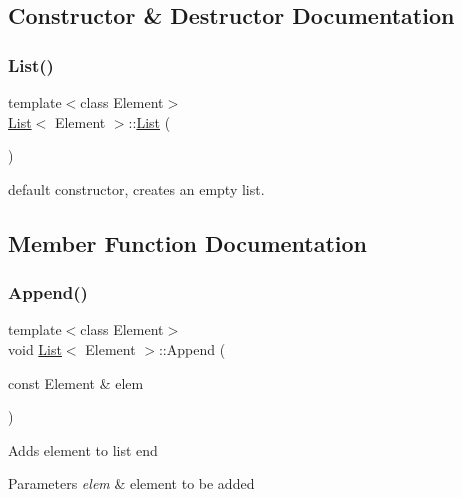 \subsection{Constructor \& Destructor Documentation}
\mbox{\label{class_list_acdfa9a2a43d22f973fe2ecc55318847a}} 
\subsubsection{\texorpdfstring{List()}{List()}}
{\footnotesize\ttfamily template$<$class Element$>$ \\
\hyperlink{class_list}{List}$<$ Element $>$\+::\hyperlink{class_list}{List} (\begin{DoxyParamCaption}{ }\end{DoxyParamCaption})\hspace{0.3cm}{\ttfamily [inline]}}

default constructor, creates an empty list. 

\subsection{Member Function Documentation}
\mbox{\label{class_list_a473190098e38206d0125b0737245e613}} 
\subsubsection{\texorpdfstring{Append()}{Append()}}
{\footnotesize\ttfamily template$<$class Element$>$ \\
void \hyperlink{class_list}{List}$<$ Element $>$\+::Append (\begin{DoxyParamCaption}\item[{const Element \&}]{elem }\end{DoxyParamCaption})\hspace{0.3cm}{\ttfamily [inline]}}

Adds element to list end 
\begin{DoxyParams}{Parameters}
{\em elem} & element to be added \\
\hline
\end{DoxyParams}
\mbox{\label{class_list_a8d86a82c138b259da6fa0d046aed985b}} 
